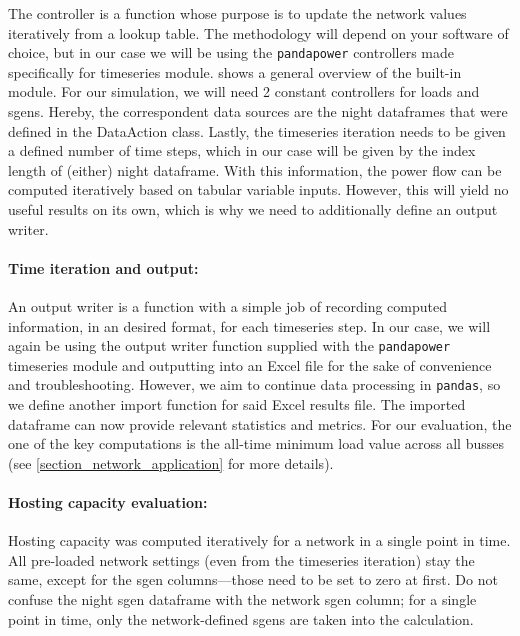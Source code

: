 \documentclass[a4paper,10pt]{report}
\begin{document}
The controller is a function whose purpose is to update the network values iteratively from a lookup table. The methodology will depend on your software of choice, but in our case we will be using the \texttt{pandapower} controllers made specifically for timeseries module.  shows a general overview of the built-in module. For our simulation, we will need 2 constant controllers for loads and sgens. Hereby, the correspondent data sources are the night dataframes that were defined in the DataAction class. Lastly, the timeseries iteration needs to be given a defined number of time steps, which in our case will be given by the index length of (either) night dataframe. With this information, the power flow can be computed iteratively based on tabular variable inputs. However, this will yield no useful results on its own, which is why we need to additionally define an output writer.

\paragraph{Time iteration and output:} An output writer is a function with a simple job of recording computed information, in an desired format, for each timeseries step. In our case, we will again be using the output writer function supplied with the \texttt{pandapower} timeseries module and outputting into an Excel file for the sake of convenience and troubleshooting. However, we aim to continue data processing in \texttt{pandas}, so we define another import function for said Excel results file. The imported dataframe can now provide relevant statistics and metrics. For our evaluation, the one of the key computations is the all-time minimum load value across all busses (see \cref{section_network_application} for more details).

\paragraph{Hosting capacity evaluation:} Hosting capacity was computed iteratively for a network in a single point in time. All pre-loaded network settings (even from the timeseries iteration) stay the same, except for the sgen columns---those need to be set to zero at first. Do not confuse the night sgen dataframe with the network sgen column; for a single point in time, only the network-defined sgens are taken into the calculation.
\end{document}
